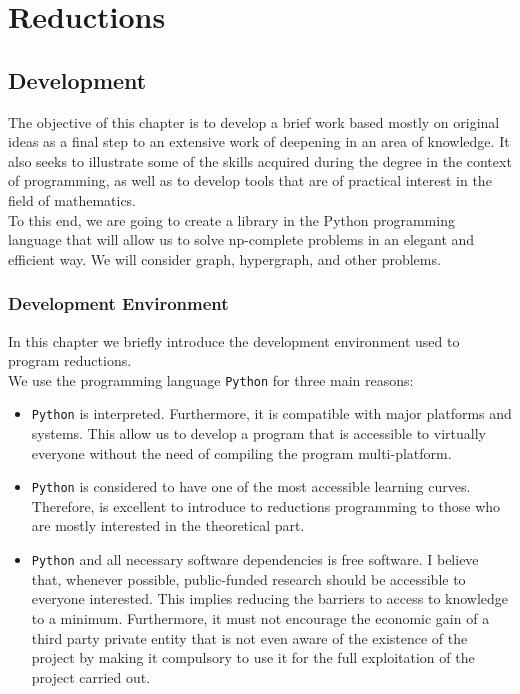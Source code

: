 \part{Reductions} %

\label{chap:3}


\chapter{Development}

The objective of this chapter is to develop a brief work based mostly on original ideas as a final step to an extensive work of deepening in an area of knowledge. It also seeks to illustrate some of the skills acquired during the degree in the context of programming, as well as to develop tools that are of practical interest in the field of mathematics. \\

To this end, we are going to create a library in the Python programming language that will allow us to solve np-complete problems in an elegant and efficient way.  We will consider graph, hypergraph, and other problems. 

\section{Development Environment}

In this chapter we briefly introduce the development environment used to program reductions.\\

We use the programming language \texttt{Python} for three main reasons:

\begin{itemize}
\item \texttt{Python} is interpreted. Furthermore, it is compatible with major platforms and systems. This allow us to develop a program that is accessible to virtually everyone without the need of compiling the program multi-platform. 

\item \texttt{Python} is considered to have one of the most accessible learning curves. Therefore, is excellent to introduce to reductions programming to those who are mostly interested in the theoretical part.

\item \texttt{Python}  and all necessary software dependencies is  free software\cite{stallman2002free}. I believe that, whenever possible, public-funded research should be accessible to everyone interested. This implies reducing the barriers to access to knowledge to a minimum.  Furthermore, it must not encourage the economic gain of a third party private entity that is not even aware of the existence of the project by making it compulsory to use it for the full exploitation of the project carried out.
\end{itemize}



